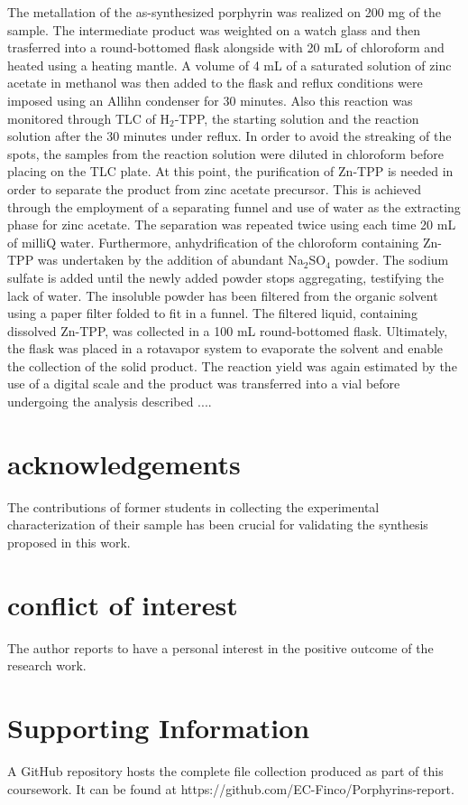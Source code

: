 \documentclass[num-refs]{wiley-article}
\begin{document}
\break
The metallation of the as-synthesized porphyrin was realized on 200 mg of the sample.
The intermediate product was weighted on a watch glass and then trasferred into a round-bottomed flask alongside with 20 mL of chloroform and heated using a heating mantle.
A volume of 4 mL of a saturated solution of zinc acetate in methanol was then added to the flask and reflux conditions were imposed using an Allihn condenser for 30 minutes.
Also this reaction was monitored through TLC of H$_{2}$-TPP, the starting solution and the reaction solution after the 30 minutes under reflux.
In order to avoid the streaking of the spots, the samples from the reaction solution were diluted in chloroform before placing on the TLC plate.
\break
At this point, the purification of Zn-TPP is needed in order to separate the product from zinc acetate precursor.
This is achieved through the employment of a separating funnel and use of water as the extracting phase for zinc acetate.
The separation was repeated twice using each time 20 mL of milliQ water.
Furthermore, anhydrification of the chloroform containing Zn-TPP was undertaken by the addition of abundant Na$_{2}$SO$_{4}$ powder.
The sodium sulfate is added until the newly added powder stops aggregating, testifying the lack of water.
The insoluble powder has been filtered from the organic solvent using a paper filter folded to fit in a funnel.
The filtered liquid, containing dissolved Zn-TPP, was collected in a 100 mL round-bottomed flask.
Ultimately, the flask was placed in a rotavapor system to evaporate the solvent and enable the collection of the solid product.
The reaction yield was again estimated by the use of a digital scale and the product was transferred into a vial before undergoing the analysis described ....

\section*{acknowledgements}
The contributions of former students in collecting the experimental characterization of their sample has been crucial for validating the synthesis proposed in this work.
\section*{conflict of interest}
The author reports to have a personal interest in the positive outcome of the research work.
\section*{Supporting Information}
A GitHub repository hosts the complete file collection produced as part of this coursework.
It can be found at https://github.com/EC-Finco/Porphyrins-report.
\printendnotes


\end{document}
